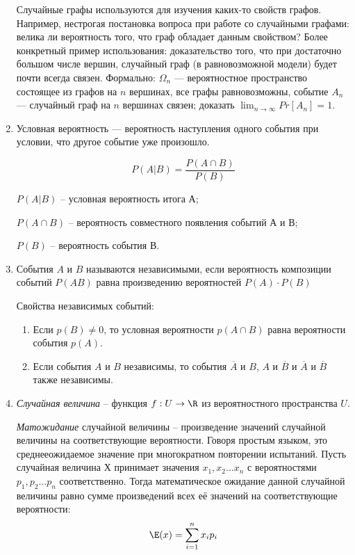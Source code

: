 \documentclass[a4paper,12pt]{article}
\begin{document}
\begin{enumerate}
    Случайные графы используются для изучения каких-то свойств графов. Например, нестрогая постановка вопроса при работе со случайными графами: велика ли вероятность того, что граф обладает данным свойством? Более конкретный пример использования: доказательство того, что при достаточно большом числе вершин, случайный граф (в равновозможной модели) будет почти всегда связен. Формально: $\Omega_n$ --- вероятностное пространство состоящее из графов на $n$ вершинах, все графы равновозможны, событие $A_n$ --- случайный граф на $n$ вершинах связен; доказать $ \lim_{n\to\infty} Pr[A_n] = 1 $.
    
	\item 
    
    Условная вероятность — вероятность наступления одного события при условии, что другое событие уже произошло.
    
   \[
       P(A|B) = \frac{{P(A\cap B)}}{P(B)}
   \]
    
    
    $P(A|B)$ – условная вероятность итога А; 
    
   $P(A\cap B)$ – вероятность совместного появления событий А и В; 
    
    $P(B)$ – вероятность события В. 
    
        \item
        События $A$ и $B$ называются независимыми, если вероятность композиции событий $P(AB)$ равна произведению вероятностей 		$P(A)\cdot P(B)$


        Свойства независимых событий: 
        \begin{enumerate}
            \item Если $p(B)\ne0$, то условная вероятности $p(A\cap B)$ равна вероятности события $p(A)$.
            \item Если события $A$ и $B$ независимы, то события $\overline{A}$ и $B$, $A$ и $\overline{B}$ и $\overline{A}$ и 	$\overline{B}$ также независимы.
        \end{enumerate}
	
	\item  
    
	    \textit{Случайная величина} -- функция $f : U \rightarrow \R$ из вероятностного пространства $U$.

	    \textit{Матожидание} случайной величины -- произведение значений случайной величины на соответствующие вероятности. Говоря простым языком, это среднееожидаемое значение при многократном повторении испытаний. Пусть случайная величина Х принимает значения $x_1, x_2 ... x_n$ с вероятностями $p_1, p_2 \ldots p_n$ соответственно. Тогда математическое ожидание  данной случайной величины равно сумме произведений всех её значений на соответствующие вероятности:
    	$$\E(x) = \sum_{i = 1}^n x_ip_i$$
    

\end{enumerate}
\end{document}

